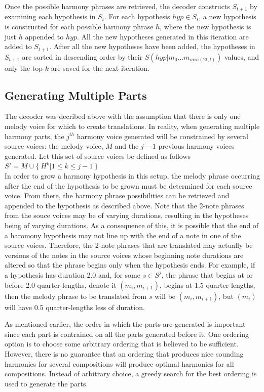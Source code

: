 \documentclass{sig-alternate}
\begin{document}
Once the possible harmony phrases are retrieved, the decoder constructs $S_{t + 1}$ by examining each hypothesis in $S_{t}$. For each hypothesis $hyp \in S_{t}$, a new hypothesis is constructed for each possible harmony phrase $h$, where the new hypothesis is just $h$ appended to $hyp$. All the new hypotheses generated in this iteration are added to $S_{t + 1}$. After all the new hypotheses have been added, the hypotheses in $S_{t + 1}$ are sorted in descending order by their $S(hyp | m_{0} ... m_{min(2t, l)})$ values, and only the top $k$ are saved for the next iteration.

\subsection {Generating Multiple Parts}
The decoder was decribed above with the assumption that there is only one melody voice for  which to create translations. In reality, when generating multiple harmony parts, the $j^{th}$ harmony voice generated will be constrained by several source voices: the melody voice, $M$ and the $j-1$ previous harmony voices generated. Let this set of source voices be defined as follows\\

$S^{j} = {M} \cup \{\ H^k | 1 \leq k \leq j- 1\ \} $\\

In order to grow a harmony hypothesis in this setup, the melody phrase occurring after the end of the hypothesis to be grown must be determined for each source voice. From there, the harmony phrase possibilities can be retrieved and appended to the hypothesis as described above. Note that the 2-note phrases from the souce voices may be of varying durations, resulting in the hypotheses being of varying durations. As a consequence of this, it is possible that the end of a haromony hypothesis may not line up with the end of a note in one of the source voices. Therefore, the 2-note phrases that are translated may actually be versions of the notes in the source voices whose beginning note durations are altered so that the phrase begins only when the hypothesis ends. For example, if a hypothesis has duration 2.0 and, for some $s \in S^{j}$, the phrase that begins at or before 2.0 quarter-lengths, denote it $(m_{i}, m_{i + 1})$, begins at 1.5 quarter-lengths, then the melody phrase to be translated from $s$ will be $(m_{i}, m_{i + 1})$, but $(m_{i})$ will have 0.5 quarter-lengths less of duration. 

As mentioned earlier, the order in which the parts are generated is important since each part is contrained on all the parts generated before it. One ordering option is to choose some arbitrary ordering that is believed to be sufficient. However, there is no guarantee that an ordering that produces nice sounding harmonies for several compositions will produce optimal harmonies for all compositions. Instead of arbitrary choice, a greedy search for the best ordering is used to generate the parts.
\end{document}
